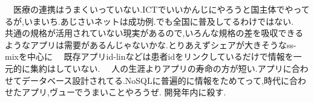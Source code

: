　医療の連携はうまくいっていない.ICTでいいかんじにやろうと国主体でやってるが,いまいち.あじさいネットは成功例.でも全国に普及してるわけではない.\cite{bibi3}
　共通の規格が活用されていない現実があるので,いろんな規格の差を吸収できるようなアプリは需要があるんじゃないかな.とりあえずシェアが大きそうなss-mixを中心に
　既存アプリid-linなどは患者idをリンクしているだけで情報を一元的に集約はしていない.
　人の生涯よりアプリの寿命の方が短い.アプリに合わせてデータベース設計されてる.NoSQLに普遍的に情報をためてって,時代に合わせたアプリ,ヴューでうまいことやろうぜ.
開発年内に殺す.
